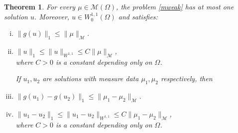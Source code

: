 \documentclass[a4paper, 11pt]{report}
\newtheorem{thm}{Theorem}[chapter]
\theoremstyle{definition}\newtheorem*{rmk}{Remark}
\begin{document}
\begin{thm}\label{apthm}
For every $\mu \in \mathcal{M}(\Omega)$, the problem \eqref{mweak} has at most one solution $u$. Moreover, $u \in W^{1,1}_0(\Omega)$ and satisfies:
\begin{enumerate}[i)]
\item $\| g(u) \|_1 \le \| \mu\|_{\mathcal{M}}$.
\item $\| u \|_1 \le \| u \|_{W^{1,1}} \le C\|\mu\|_{\mathcal{M}}$,\\ where $C>0$ is a constant depending only on $\Omega$.

If $u_1,u_2$ are solutions with measure data $\mu_1,\mu_2$ respectively, then
\item $\|g(u_1) -g(u_2)\|_1 \le \| \mu_1 - \mu_2 \|_{\mathcal{M}}$.
\item $\| u_1 - u_2 \|_1 \le \| u_1 - u_2 \|_{W^{1,1}} \le C\|\mu_1 - \mu_2\|_{\mathcal{M}}$,\\
where $C>0$ is a constant depending only on $\Omega$.
\end{enumerate}
\end{thm}
\end{document}
